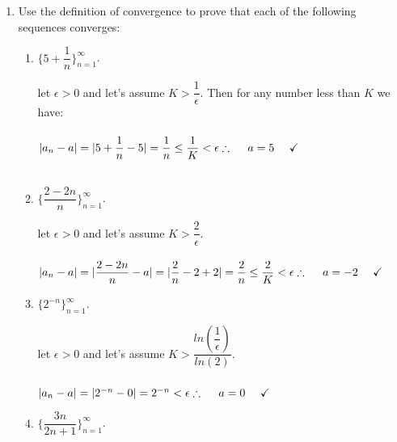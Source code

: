 \documentclass[fleqn]{article}
\begin{document}
\begin{enumerate}
    \item Use the definition of convergence to prove that each of the following sequences converges:
    \begin{enumerate}
      \item $\{5+\dfrac{1}{n}\}_{n=1}^{\infty}$.

        \textcolor{hwColor}{
          let $\epsilon > 0$ and let's assume $K>\dfrac{1}{\epsilon}$. Then for any number less than $K$ we have:
          \\
          \\
          $
            |a_n-a|=|5+\dfrac{1}{n}-5|=\dfrac{1}{n} \leq \dfrac{1}{K} < \epsilon 
            \\
            \\
            \\
            \therefore ~~~~ a=5 ~~~~ \checkmark
          $
          \\
          \\
        }
      
      \item $\{\dfrac{2-2n}{n}\}_{n=1}^{\infty}$.

        \textcolor{hwColor}{
          let $\epsilon > 0$ and let's assume $K>\dfrac{2}{\epsilon}$.
          \\
          \\
          $
            |a_n-a|=|\dfrac{2-2n}{n}-a|=|\dfrac{2}{n}-2+2|=\dfrac{2}{n} \leq \dfrac{2}{K}< \epsilon
            \\
            \\
            \\
            \therefore ~~~~ a=-2 ~~~~ \checkmark
          $
          \\
        }

      \item $\{2^{-n}\}_{n=1}^{\infty}$.

        \textcolor{hwColor}{
          let $\epsilon > 0$ and let's assume $K>\dfrac{ln(\dfrac{1}{\epsilon})}{ln(2)}$.
          \\
          \\
          $
            |a_n-a|=|2^{-n}-0|=2^{-n} <\epsilon
            \\
            \\
            \\
            \therefore ~~~~ a=0 ~~~~ \checkmark
          $
          \\
        }

      \item $\{\dfrac{3n}{2n+1}\}_{n=1}^{\infty}$.


\end{enumerate}
\end{enumerate}
\end{document}
